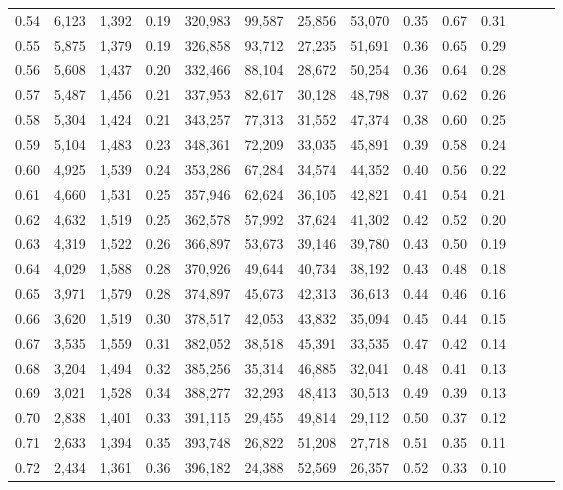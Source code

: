 \begin{tabular}{rrrrrrrrrrrrrr}
0.54 &  6,123 &  1,392 &  0.19 &  320,983 &   99,587 &  25,856 &  53,070 &  0.35 &  0.67 &      0.31 \\
0.55 &  5,875 &  1,379 &  0.19 &  326,858 &   93,712 &  27,235 &  51,691 &  0.36 &  0.65 &      0.29 \\
0.56 &  5,608 &  1,437 &  0.20 &  332,466 &   88,104 &  28,672 &  50,254 &  0.36 &  0.64 &      0.28 \\
0.57 &  5,487 &  1,456 &  0.21 &  337,953 &   82,617 &  30,128 &  48,798 &  0.37 &  0.62 &      0.26 \\
0.58 &  5,304 &  1,424 &  0.21 &  343,257 &   77,313 &  31,552 &  47,374 &  0.38 &  0.60 &      0.25 \\
0.59 &  5,104 &  1,483 &  0.23 &  348,361 &   72,209 &  33,035 &  45,891 &  0.39 &  0.58 &      0.24 \\
0.60 &  4,925 &  1,539 &  0.24 &  353,286 &   67,284 &  34,574 &  44,352 &  0.40 &  0.56 &      0.22 \\
0.61 &  4,660 &  1,531 &  0.25 &  357,946 &   62,624 &  36,105 &  42,821 &  0.41 &  0.54 &      0.21 \\
0.62 &  4,632 &  1,519 &  0.25 &  362,578 &   57,992 &  37,624 &  41,302 &  0.42 &  0.52 &      0.20 \\
0.63 &  4,319 &  1,522 &  0.26 &  366,897 &   53,673 &  39,146 &  39,780 &  0.43 &  0.50 &      0.19 \\
0.64 &  4,029 &  1,588 &  0.28 &  370,926 &   49,644 &  40,734 &  38,192 &  0.43 &  0.48 &      0.18 \\
0.65 &  3,971 &  1,579 &  0.28 &  374,897 &   45,673 &  42,313 &  36,613 &  0.44 &  0.46 &      0.16 \\
0.66 &  3,620 &  1,519 &  0.30 &  378,517 &   42,053 &  43,832 &  35,094 &  0.45 &  0.44 &      0.15 \\
0.67 &  3,535 &  1,559 &  0.31 &  382,052 &   38,518 &  45,391 &  33,535 &  0.47 &  0.42 &      0.14 \\
0.68 &  3,204 &  1,494 &  0.32 &  385,256 &   35,314 &  46,885 &  32,041 &  0.48 &  0.41 &      0.13 \\
0.69 &  3,021 &  1,528 &  0.34 &  388,277 &   32,293 &  48,413 &  30,513 &  0.49 &  0.39 &      0.13 \\
0.70 &  2,838 &  1,401 &  0.33 &  391,115 &   29,455 &  49,814 &  29,112 &  0.50 &  0.37 &      0.12 \\
0.71 &  2,633 &  1,394 &  0.35 &  393,748 &   26,822 &  51,208 &  27,718 &  0.51 &  0.35 &      0.11 \\
0.72 &  2,434 &  1,361 &  0.36 &  396,182 &   24,388 &  52,569 &  26,357 &  0.52 &  0.33 &      0.10 \\

\end{tabular}
